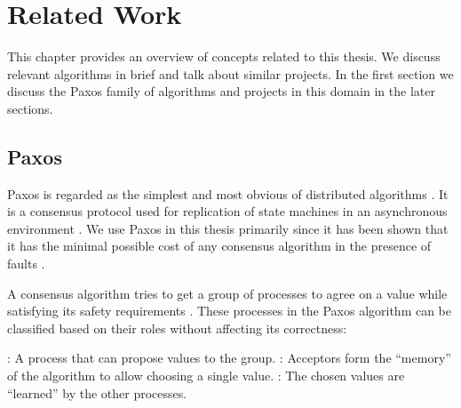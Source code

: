 \chapter{Related Work}
\label{chapter:related.work}

This chapter provides an overview of concepts related to this thesis. We
discuss relevant algorithms in brief and talk about similar projects. In the 
first section we discuss the Paxos family of algorithms and projects in 
this domain in the later sections.

\section{Paxos}
\label{section:paxos}

Paxos is regarded as the simplest and most obvious of distributed algorithms 
\citep{Lamport01}. It is a consensus protocol used for replication of state
machines in an asynchronous environment \citep{Lamport98}. We use Paxos in this
thesis primarily since it has been shown that it has the minimal possible cost
of any consensus algorithm in the presence of faults \citep{KeidarR03}.

A consensus algorithm tries to get a group of processes to agree on a value 
while satisfying its safety requirements%
. 
These processes in the Paxos algorithm can be classified based on their roles
without affecting its correctness:

\begin{itemize}
  : A process that can propose values to the group. 
  : Acceptors form the ``memory'' of the algorithm to 
    allow choosing a single value.
  : The chosen values are ``learned'' by the other
    processes.
\end{itemize}

